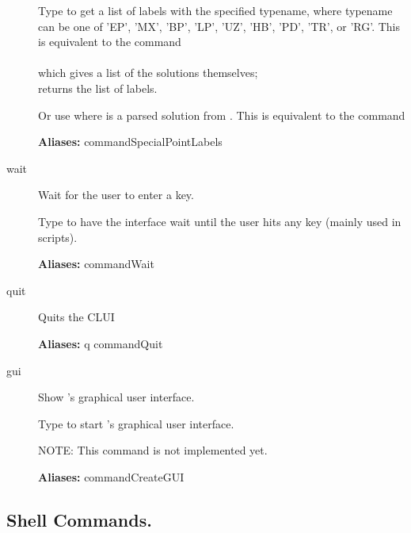 \documentclass[12pt]{report}
\begin{document}
\begin{description}
    Type  to get a list of labels with the specified
    typename, where typename can be one of
    'EP', 'MX', 'BP', 'LP', 'UZ', 'HB', 'PD', 'TR', or 'RG'.
    This is equivalent to the command\\
    \\
    which gives a list of the solutions themselves;
    \\
    returns the list of labels.

    Or use  where  is a parsed
    solution from .
    This is equivalent to the command\\

\textbf{Aliases:} commandSpecialPointLabels

\item[wait]
Wait for the user to enter a key.

    Type  to have the \AUTO interface wait
    until the user hits any key (mainly used in scripts).

\textbf{Aliases:} commandWait

\item[quit]
Quits the \AUTO CLUI

\textbf{Aliases:} q commandQuit

\item[gui]
Show \AUTO's graphical user interface.

    Type  to start \AUTO's graphical user interface.
    
    NOTE: This command is not implemented yet.
    
\textbf{Aliases:} commandCreateGUI

\end{description}

\subsection{Shell Commands.} \label{sec:clui_ref_shell}
\end{document}
